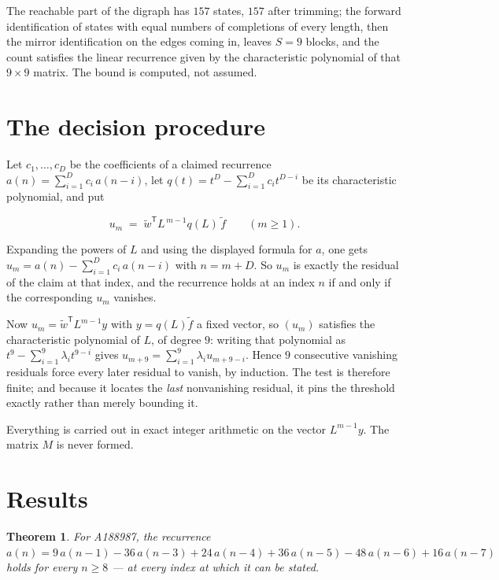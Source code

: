 \documentclass[11pt]{article}
\newtheorem{theorem}{Theorem}
\theoremstyle{definition}
\begin{document}
The reachable part of the digraph has $157$ states, $157$ after trimming; the forward identification of states with equal numbers of completions of every length, then the mirror identification on the edges coming in, leaves $S = 9$ blocks, and the count satisfies the linear recurrence given by the characteristic polynomial of that $9\times9$ matrix. The bound is computed, not assumed.

\section{The decision procedure}

Let $c_1,\dots,c_D$ be the coefficients of a claimed recurrence $a(n) = \sum_{i=1}^{D} c_i\,a(n-i)$, let $q(t) = t^{D} - \sum_{i=1}^{D} c_i t^{D-i}$ be its characteristic polynomial, and put

\[u_m \;=\; \tilde w^{\mathsf T} L^{\,m-1} q(L)\,\tilde f \qquad (m \ge 1).\]

Expanding the powers of $L$ and using the displayed formula for $a$, one gets $u_m = a(n) - \sum_{i=1}^{D} c_i\,a(n-i)$ with $n = m + D$. So $u_m$ is exactly the residual of the claim at that index, and the recurrence holds at an index $n$ if and only if the corresponding $u_m$ vanishes.

Now $u_m = \tilde w^{\mathsf T} L^{m-1} y$ with $y = q(L)\tilde f$ a fixed vector, so $(u_m)$ satisfies the characteristic polynomial of $L$, of degree $9$: writing that polynomial as $t^{9} - \sum_{i=1}^{9} \lambda_i t^{9-i}$ gives $u_{m+9} = \sum_{i=1}^{9} \lambda_i u_{m+9-i}$. Hence $9$ consecutive vanishing residuals force every later residual to vanish, by induction. The test is therefore finite; and because it locates the {\itshape last} nonvanishing residual, it pins the threshold exactly rather than merely bounding it.

Everything is carried out in exact integer arithmetic on the vector $L^{m-1}y$. The matrix $M$ is never formed.

\section{Results}

\begin{theorem} For A188987, the recurrence $a(n) = 9\,a(n-1) - 36\,a(n-3) + 24\,a(n-4) + 36\,a(n-5) - 48\,a(n-6) + 16\,a(n-7)$ holds for every $n \ge 8$ --- at every index at which it can be stated.\end{theorem}
\end{document}

